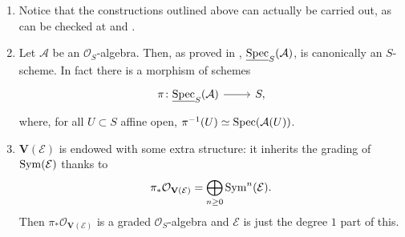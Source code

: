 \newpage
\begin{rem}[]\leavevmode\vspace{-.2\baselineskip}
\begin{enumerate}
	\item Notice that the constructions outlined above can actually be carried out,
		as can be checked at 
		\cite[\href{https://stacks.math.columbia.edu/tag/01LL}{Section 01LL}]{SP}
		and
		\cite[\href{https://stacks.math.columbia.edu/tag/01M1}{Section 01M1}]{SP}.

	\item Let $\mathcal{A}$ be an $\mathcal{O}_{ S }$-algebra. 
		Then, as proved in 
		\cite[\href{https://stacks.math.columbia.edu/tag/01LP}{Lemma 01LP}]{SP},
		$\underline{\operatorname{Spec}}_S(\mathcal{A})$, is canonically an $S$-scheme.
		In fact there is a morphism of schemes
		\begin{equation*}
		\begin{tikzcd}[row sep = 0ex
			,/tikz/column 1/.append style={anchor=base east}
			,/tikz/column 2/.append style={anchor=base west}]
			\pi\colon \underline{\spec}_S(\mathcal{A})
			\arrow[r, "", rightarrow] &
			S
		,\end{tikzcd}
		\end{equation*} 
		where, for all $U \subset S$ affine open,
		$\pi^{-1}(U) \simeq \operatorname{Spec}(\mathcal{A}(U))$.

	\item $\mathbf{V}(\mathcal{E})$ is endowed with
		some extra structure: it inherits the grading of $\operatorname{Sym}(\mathcal{E})$
		thanks to
		\begin{equation*}
			\pi_* \mathcal{O}_{ \mathbf{V}(\mathcal{E}) } =
			\bigoplus_{n \geq 0} \operatorname{Sym}^n (\mathcal{E})
		.\end{equation*}
		Then $\pi_* \mathcal{O}_{ \mathbf{V}(\mathcal{E}) }$ is a graded
		$\mathcal{O}_{ S }$-algebra and $\mathcal{E}$ is just the degree $1$ part
		of this.
\end{enumerate}
\end{rem}


